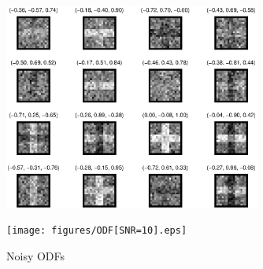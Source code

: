 \documentclass[10pt]{article}
\begin{document}
\begin{figure}[H]
  \centering
  \includegraphics[width=0.75\textwidth]{figures/DWI04[SNR=10].eps}
\end{figure}
\begin{figure}[H]
  \centering
  \texttt{[image: figures/ODF[SNR=10].eps]}
  \caption{Noisy ODFs}
\end{figure}
\end{document}
